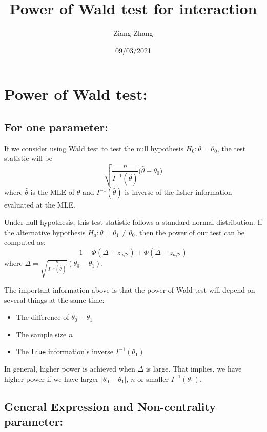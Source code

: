 \documentclass[
]{article}
\title{Power of Wald test for interaction}
\author{Ziang Zhang}
\date{09/03/2021}
\providecommand{\tightlist}{%
  \setlength{\itemsep}{0pt}\setlength{\parskip}{0pt}}
\begin{document}
\maketitle

{
\setcounter{tocdepth}{2}
\tableofcontents
}
\clearpage

\hypertarget{power-of-wald-test}{%
\section{Power of Wald test:}\label{power-of-wald-test}}

\hypertarget{for-one-parameter}{%
\subsection{For one parameter:}\label{for-one-parameter}}

If we consider using Wald test to test the null hypothesis
\(H_0:\theta=\theta_0\), the test statistic will be
\[\sqrt{\frac{n}{I^{-1}(\hat{\theta})}}\bigg(\hat{\theta} - \theta_0\bigg)\]
where \(\hat{\theta}\) is the MLE of \(\theta\) and
\(I^{-1}(\hat{\theta})\) is inverse of the fisher information evaluated
at the MLE.

Under null hypothesis, this test statistic follows a standard normal
distribution. If the alternative hypothesis
\(H_a:\theta=\theta_1 \neq \theta_0\), then the power of our test can be
computed as: \[1-\Phi(\Delta+z_{a/2}) + \Phi(\Delta-z_{a/2})\] where
\(\Delta = \sqrt{\frac{n}{I^{-1}(\hat{\theta})}}(\theta_0-\theta_1)\).

The important information above is that the power of Wald test will
depend on several things at the same time:

\begin{itemize}
\tightlist
\item
  The difference of \(\theta_0 - \theta_1\)
\item
  The sample size \(n\)
\item
  The \texttt{true} information's inverse \(I^{-1}(\theta_1)\)
\end{itemize}

In general, higher power is achieved when \(\Delta\) is large. That
implies, we have higher power if we have larger
\(|\theta_0 - \theta_1|\), \(n\) or smaller \(I^{-1}(\theta_1)\).

\hypertarget{general-expression-and-non-centrality-parameter}{%
\subsection{General Expression and Non-centrality
parameter:}\label{general-expression-and-non-centrality-parameter}}
\end{document}
